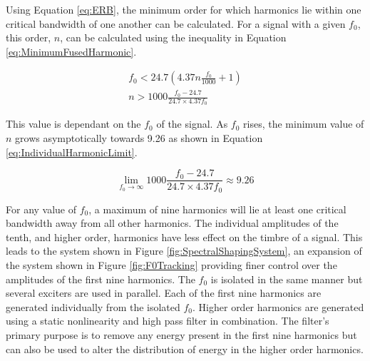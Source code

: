 		Using Equation \ref{eq:ERB}, the minimum order for which harmonics lie within one critical bandwidth of one
		another can be calculated. For a signal with a given $f_{0}$, this order, $n$, can be calculated using the
		inequality in Equation \ref{eq:MinimumFusedHarmonic}.

		\begin{gather}
			f_{0} < 24.7 \left( 4.37n \frac{f_{0}}{1000} + 1 \right) \nonumber \\
			n > 1000 \frac{f_{0} - 24.7}{24.7 \times 4.37f_{0}}
			\label{eq:MinimumFusedHarmonic}
		\end{gather}

		This value is dependant on the $f_{0}$ of the signal. As $f_{0}$ rises, the minimum value of $n$ grows
		asymptotically towards 9.26 as shown in Equation \ref{eq:IndividualHarmonicLimit}.

		\begin{equation}
			\lim_{f_{0} \to \infty} 1000 \frac{f_{0} - 24.7}{24.7 \times 4.37f_{0}} \approx 9.26
			\label{eq:IndividualHarmonicLimit}
		\end{equation}

		For any value of $f_{0}$, a maximum of nine harmonics will lie at least one critical bandwidth away from
		all other harmonics. The individual amplitudes of the tenth, and higher order, harmonics have less effect
		on the timbre of a signal. This leads to the system shown in Figure \ref{fig:SpectralShapingSystem}, an
		expansion of the system shown in Figure \ref{fig:F0Tracking} providing finer control over the amplitudes of
		the first nine harmonics. The $f_{0}$ is isolated in the same manner but several exciters are used in
		parallel. Each of the first nine harmonics are generated individually from the isolated $f_{0}$. Higher
		order harmonics are generated using a static nonlinearity and high pass filter in combination. The filter's
		primary purpose is to remove any energy present in the first nine harmonics but can also be used to alter
		the distribution of energy in the higher order harmonics.


